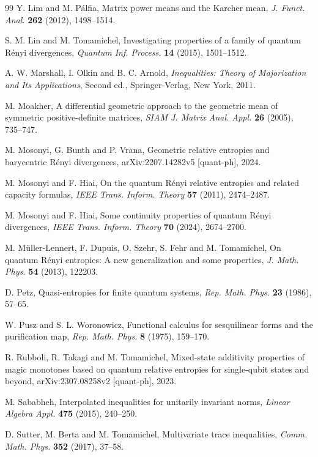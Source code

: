 \documentclass[11pt,reqno]{article}
\numberwithin{equation}{section}
\begin{document}
\begin{thebibliography}{99}
Y. Lim and M. P\'alfia, Matrix power means and the Karcher mean,
{\it J. Funct. Anal.} {\bf 262} (2012), 1498--1514.

S. M. Lin and M. Tomamichel, Investigating properties of a family of quantum R\'enyi divergences,
{\it Quantum Inf. Process.} {\bf 14} (2015), 1501--1512.

A. W. Marshall, I. Olkin and B. C. Arnold,
{\it Inequalities: Theory of Majorization and Its Applications}, Second ed.,
Springer-Verlag, New York, 2011.


M. Moakher, A differential geometric approach to the geometric mean of symmetric positive-definite matrices,
{\it SIAM J. Matrix Anal. Appl.} {\bf 26} (2005), 735--747.

M. Mosonyi, G. Bunth and P. Vrana, Geometric relative entropies and barycentric R\'enyi divergences,
arXiv:2207.14282v5 [quant-ph], 2024.

M. Mosonyi and F. Hiai, On the quantum R\'enyi relative entropies and related capacity formulas,
{\it IEEE Trans. Inform. Theory} {\bf 57} (2011), 2474--2487.

M. Mosonyi and F. Hiai, Some continuity properties of quantum R\'enyi divergences,
{\it IEEE Trans. Inform. Theory} {\bf 70} (2024), 2674--2700.

M. M\"uller-Lennert, F. Dupuis, O. Szehr, S. Fehr and M. Tomamichel,
On quantum R\'enyi entropies: A new generalization and some properties,
{\it J. Math. Phys.} {\bf 54} (2013), 122203.

D. Petz, Quasi-entropies for finite quantum systems,
{\it Rep. Math. Phys.} {\bf 23} (1986), 57--65.

W. Pusz and S. L. Woronowicz, Functional calculus for sesquilinear forms and the purification map,
{\it Rep. Math. Phys.} {\bf 8} (1975), 159--170.

R. Rubboli, R. Takagi and M. Tomamichel, Mixed-state additivity properties of magic monotones
based on quantum relative entropies for single-qubit states and beyond,
arXiv:2307.08258v2 [quant-ph], 2023.

M. Sababheh, Interpolated inequalities for unitarily invariant norms,
{\it Linear Algebra Appl.} {\bf 475} (2015), 240--250.

D. Sutter, M. Berta and M. Tomamichel, Multivariate trace inequalities,
{\it Comm. Math. Phys.} {\bf 352} (2017), 37--58.


\end{thebibliography}
\end{document}
